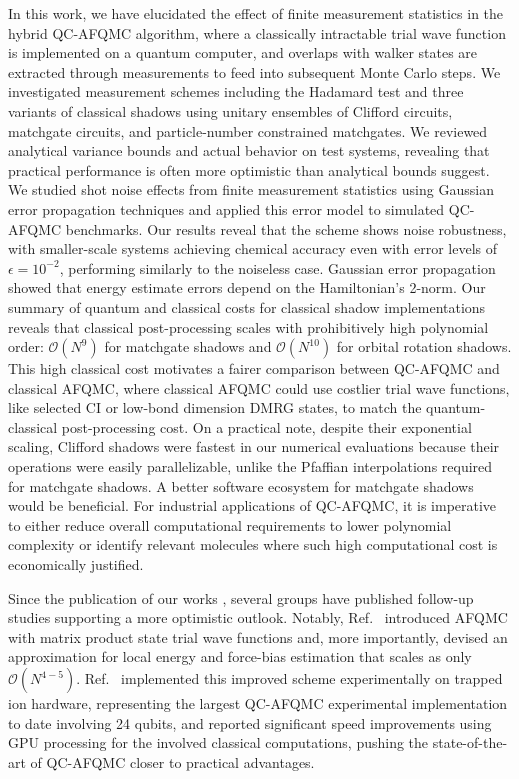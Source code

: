 \documentclass[../main.tex]{subfiles}
\begin{document}
In this work, we have elucidated the effect of finite measurement statistics in the hybrid QC-AFQMC algorithm, where a classically intractable trial wave function is implemented on a quantum computer, and overlaps with walker states are extracted through measurements to feed into subsequent Monte Carlo steps. We investigated measurement schemes including the Hadamard test and three variants of classical shadows using unitary ensembles of Clifford circuits, matchgate circuits, and particle-number constrained matchgates. We reviewed analytical variance bounds and actual behavior on test systems, revealing that practical performance is often more optimistic than analytical bounds suggest.
We studied shot noise effects from finite measurement statistics using Gaussian error propagation techniques and applied this error model to simulated QC-AFQMC benchmarks. Our results reveal that the scheme shows noise robustness, with smaller-scale systems achieving chemical accuracy even with error levels of $\epsilon = 10^{-2}$, performing similarly to the noiseless case. Gaussian error propagation showed that energy estimate errors depend on the Hamiltonian's 2-norm.
Our summary of quantum and classical costs for classical shadow implementations reveals that classical post-processing scales with prohibitively high polynomial order: $\mathcal{O}(N^9)$ for matchgate shadows and $\mathcal{O}(N^{10})$ for orbital rotation shadows. This high classical cost motivates a fairer comparison between QC-AFQMC and classical AFQMC, where classical AFQMC could use costlier trial wave functions, like selected CI or low-bond dimension DMRG states, to match the quantum-classical post-processing cost. On a practical note, despite their exponential scaling, Clifford shadows were fastest in our numerical evaluations because their operations were easily parallelizable, unlike the Pfaffian interpolations required for matchgate shadows. A better software ecosystem for matchgate shadows would be beneficial.
For industrial applications of QC-AFQMC, it is imperative to either reduce overall computational requirements to lower polynomial complexity or identify relevant molecules where such high computational cost is economically justified.

Since the publication of our works \cite{amsler2023classical, kiser2024classical}, several groups have published follow-up studies \cite{kanno2024quantum, danilov2025enhancing, blunt2025quantum, kiser2025contextual, huang2024evaluating} supporting a more optimistic outlook. Notably, Ref.~\cite{jiang2024improved} introduced AFQMC with matrix product state trial wave functions and, more importantly, devised an approximation for local energy and force-bias estimation that scales as only $\mathcal{O}(N^{4-5})$. Ref.~\cite{zhao2025quantum} implemented this improved scheme experimentally on trapped ion hardware, representing the largest QC-AFQMC experimental implementation to date involving 24 qubits, and reported significant speed improvements using GPU processing for the involved classical computations, pushing the state-of-the-art of QC-AFQMC closer to practical advantages. 
\end{document}
